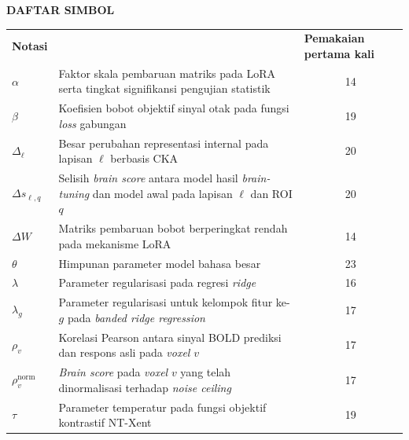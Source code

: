 \cleardoublepage
\vspace{2cm}
\begin{center}
{\fontsize{14}{16.8}\selectfont\textbf{DAFTAR SIMBOL}}\\[1em]
\end{center}
\label{chap:simbol}
\setcounter{chapter}{0}
\setcounter{section}{0}
\vspace{2em}




\begin{longtable}{@{} l >{\raggedright\arraybackslash}p{6.5cm} c @{}}
\multicolumn{1}{l}{\textbf{Notasi}} & \multicolumn{1}{l}{\textbf{Deskripsi}} & \multicolumn{1}{l}{\parbox[c]{3.5cm}{\raggedright \textbf{Pemakaian pertama kali}}} \\




$\alpha$ & Faktor skala pembaruan matriks pada LoRA serta tingkat signifikansi pengujian statistik & 14 \\
$\beta$ & Koefisien bobot objektif sinyal otak pada fungsi \textit{loss} gabungan & 19 \\
$\Delta_\ell$ & Besar perubahan representasi internal pada lapisan $\ell$ berbasis CKA & 20 \\
$\Delta s_{\ell,q}$ & Selisih \textit{brain score} antara model hasil \textit{brain-tuning} dan model awal pada lapisan $\ell$ dan ROI $q$ & 20 \\
$\Delta W$ & Matriks pembaruan bobot berperingkat rendah pada mekanisme LoRA & 14 \\
$\theta$ & Himpunan parameter model bahasa besar & 23 \\
$\lambda$ & Parameter regularisasi pada regresi \textit{ridge} & 16 \\
$\lambda_g$ & Parameter regularisasi untuk kelompok fitur ke-$g$ pada \textit{banded ridge regression} & 17 \\
$\rho_v$ & Korelasi Pearson antara sinyal BOLD prediksi dan respons asli pada \textit{voxel} $v$ & 17 \\
$\rho_v^{\text{norm}}$ & \textit{Brain score} pada \textit{voxel} $v$ yang telah dinormalisasi terhadap \textit{noise ceiling} & 17 \\
$\tau$ & Parameter temperatur pada fungsi objektif kontrastif NT-Xent & 19 \\[1ex]


\end{longtable}
